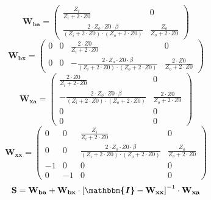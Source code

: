 \[ \mathbf{W_{ba}} = \left(\begin{smallmatrix} \frac{Z_i}{Z_i+2\cdot
Z0} & 0 \\ \frac{2\cdot Z_o\cdot Z0\cdot \beta}{\left(Z_i+2\cdot
Z0\right)\cdot\left(Z_o+2\cdot Z0\right)} & \frac{Z_o}{Z_o+2\cdot Z0}
\end{smallmatrix}\right) \]
\[ \mathbf{W_{bx}} = \left(\begin{smallmatrix} 0 & 0 & \frac{2\cdot
Z0}{Z_i+2\cdot Z0} & 0 \\ 0 & 0 & -\frac{2\cdot Z_o\cdot Z0\cdot
\beta}{\left(Z_i+2\cdot Z0\right)\cdot\left(Z_o+2\cdot Z0\right)} &
\frac{2\cdot Z0}{Z_o+2\cdot Z0} \end{smallmatrix}\right) \]
\[ \mathbf{W_{xa}} = \left(\begin{smallmatrix} \frac{2\cdot
Z0}{Z_i+2\cdot Z0} & 0 \\ -\frac{2\cdot Z_o\cdot Z0\cdot
\beta}{\left(Z_i+2\cdot Z0\right)\cdot\left(Z_o+2\cdot Z0\right)} &
\frac{2\cdot Z0}{Z_o+2\cdot Z0} \\ 0 & 0 \\ 0 & 0
\end{smallmatrix}\right) \]
\[ \mathbf{W_{xx}} = \left(\begin{smallmatrix} 0 & 0 &
\frac{Z_i}{Z_i+2\cdot Z0} & 0 \\ 0 & 0 & \frac{2\cdot Z_o\cdot Z0\cdot
\beta}{\left(Z_i+2\cdot Z0\right)\cdot\left(Z_o+2\cdot Z0\right)} &
\frac{Z_o}{Z_o+2\cdot Z0} \\ -1 & 0 & 0 & 0 \\ 0 & -1 & 0 & 0
\end{smallmatrix}\right) \]
\[ \mathbf{S}=\mathbf{W_{ba}}+\mathbf{W_{bx}}\cdot\left[
\boldsymbol{\mathbbm{I}}
-\mathbf{W_{xx}}\right]^{-1}\cdot\mathbf{W_{xa}} \]
